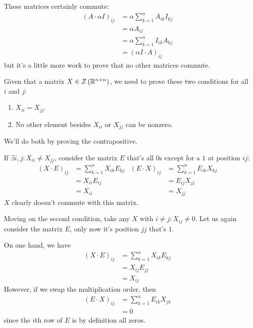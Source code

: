 \documentclass[12pt]{article}
\begin{document}
These matrices certainly commute:
\begin{align*}
  (A \cdot \alpha I)_{ij}
   & = \alpha \sum_{k=1}^{n} A_{ik} I_{kj} \\
   & = \alpha A_{ij}                       \\
   & = \alpha \sum_{k=1}^{n} I_{ik} A_{kj} \\
   & = (\alpha I \cdot A)_{ij}
\end{align*}
but it's a little more work to prove that no other matrices commute.

Given that a matrix $X \in Z\left(\mathbb{R}^{n \times n}\right)$, we need to prove
these two conditions for all $i$ and $j$:
\begin{enumerate}[nolistsep]
  \item $X_{ii}=X_{jj}$.
  \item No other element besides $X_{ii}$ or $X_{jj}$ can be nonzero.
\end{enumerate}
We'll do both by proving the contrapositive.

If $\exists i, j: X_{ii} \ne X_{jj}$, consider the matrix $E$
that's all $0$s except for a $1$ at position $ij$:
\begin{align*}
  (X \cdot E)_{ij} & = \sum_{k=1}^{n} X_{ik} E_{kj} & (E \cdot X)_{ij} & = \sum_{k=1}^{n} E_{ik} X_{kj} \\
                        & = X_{ii} E_{ij}                &                       & = E_{ij} X_{jj}                \\
                        & = X_{ii}                            &                       & = X_{jj}
\end{align*}
$X$ clearly doesn't commute with this matrix.

Moving on the second condition, take any $X$ with $i \ne j: X_{ij} \ne 0$.
Let us again consider the matrix $E$, only now it's position $jj$ that's $1$.

On one hand, we have
\begin{align*}
  (X \cdot E)_{ij}
  &= \sum_{k=1}^{n} X_{ik} E_{kj} \\
  &= X_{ij} E_{jj} \\
  &= X_{ij}
\end{align*}
However, if we swap the multiplication order, then
\begin{align*}
  (E \cdot X)_{ij}
  &= \sum_{k=1}^{n} E_{ik} X_{jk} \\
  &= 0
\end{align*}
since the $i$th row of $E$ is by definition all zeros.
\end{document}
